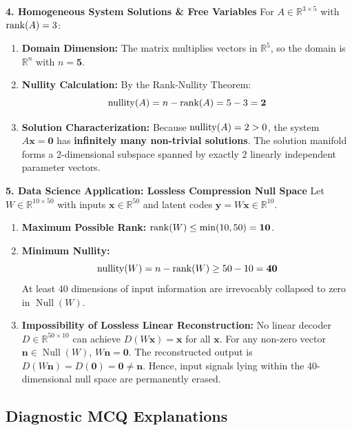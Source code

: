 \textbf{4. Homogeneous System Solutions \& Free Variables}
For $A \in \mathbb{R}^{3 \times 5}$ with $\operatorname{rank}(A) = 3$:
\begin{enumerate}
    \item \textbf{Domain Dimension:} The matrix multiplies vectors in $\mathbb{R}^5$, so the domain is $\mathbb{R}^n$ with $n = \mathbf{5}$.
    \item \textbf{Nullity Calculation:} By the Rank-Nullity Theorem:
    \begin{equation*}
    \operatorname{nullity}(A) = n - \operatorname{rank}(A) = 5 - 3 = \mathbf{2}
    \end{equation*}
    \item \textbf{Solution Characterization:}
    Because $\operatorname{nullity}(A) = 2 > 0$, the system $A\mathbf{x} = \mathbf{0}$ has \textbf{infinitely many non-trivial solutions}. The solution manifold forms a 2-dimensional subspace spanned by exactly $2$ linearly independent parameter vectors.
\end{enumerate}

\textbf{5. Data Science Application: Lossless Compression Null Space}
Let $W \in \mathbb{R}^{10 \times 50}$ with inputs $\mathbf{x} \in \mathbb{R}^{50}$ and latent codes $\mathbf{y} = W\mathbf{x} \in \mathbb{R}^{10}$.
\begin{enumerate}
    \item \textbf{Maximum Possible Rank:} $\operatorname{rank}(W) \le \min(10, 50) = \mathbf{10}$.
    \item \textbf{Minimum Nullity:}
    \begin{equation*}
    \operatorname{nullity}(W) = n - \operatorname{rank}(W) \ge 50 - 10 = \mathbf{40}
    \end{equation*}
    At least 40 dimensions of input information are irrevocably collapsed to zero in $\operatorname{Null}(W)$.
    \item \textbf{Impossibility of Lossless Linear Reconstruction:}
    No linear decoder $D \in \mathbb{R}^{50 \times 10}$ can achieve $D(W\mathbf{x}) = \mathbf{x}$ for all $\mathbf{x}$.
    For any non-zero vector $\mathbf{n} \in \operatorname{Null}(W)$, $W\mathbf{n} = \mathbf{0}$. The reconstructed output is $D(W\mathbf{n}) = D(\mathbf{0}) = \mathbf{0} \neq \mathbf{n}$.
    Hence, input signals lying within the 40-dimensional null space are permanently erased.
\end{enumerate}

\subsection*{Diagnostic MCQ Explanations}

